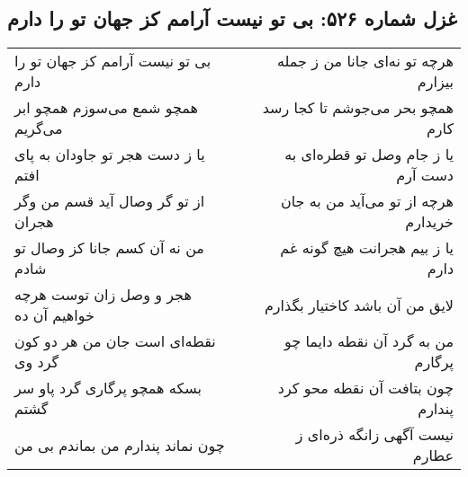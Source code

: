 \begin{center}
\section*{غزل شماره ۵۲۶: بی تو نیست آرامم کز جهان تو را دارم}
\label{sec:526}
\begin{longtable}{l p{0.5cm} r}
بی تو نیست آرامم کز جهان تو را دارم
&&
هرچه تو نه‌ای جانا من ز جمله بیزارم
\\
همچو شمع می‌سوزم همچو ابر می‌گریم
&&
همچو بحر می‌جوشم تا کجا رسد کارم
\\
یا ز دست هجر تو جاودان به پای افتم
&&
یا ز جام وصل تو قطره‌ای به دست آرم
\\
از تو گر وصال آید قسم من وگر هجران
&&
هرچه از تو می‌آید من به جان خریدارم
\\
من نه آن کسم جانا کز وصال تو شادم
&&
یا ز بیم هجرانت هیچ گونه غم دارم
\\
هجر و وصل زان توست هرچه خواهیم آن ده
&&
لایق من آن باشد کاختیار بگذارم
\\
نقطه‌ای است جان من هر دو کون گرد وی
&&
من به گرد آن نقطه دایما چو پرگارم
\\
بسکه همچو پرگاری گرد پاو سر گشتم
&&
چون بتافت آن نقطه محو کرد پندارم
\\
چون نماند پندارم من بماندم بی من
&&
نیست آگهی زانگه ذره‌ای ز عطارم
\\
\end{longtable}
\end{center}
